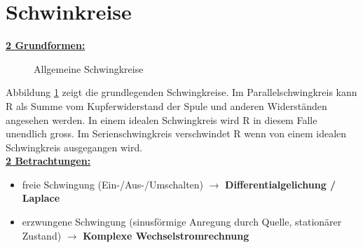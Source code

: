 \section{Schwinkreise}
\underline{\textbf{2 Grundformen:}}\\
\begin{figure}[!h]
\centering
{}
\qquad
{}
\caption{Allgemeine Schwingkreise}
\label{fig:schwingkreise}
\end{figure}

Abbildung \ref{fig:schwingkreise} zeigt die grundlegenden Schwingkreise. Im
Parallelschwingkreis  kann R als Summe vom
Kupferwiderstand der Spule und anderen Widerständen angesehen werden. In einem
idealen Schwingkreis wird R in diesem Falle unendlich gross. Im
Serienschwingkreis  verschwindet R wenn von
einem idealen Schwingkreis ausgegangen wird. \\

\underline{\textbf{2 Betrachtungen:}}\\
\begin{itemize}
  \item freie Schwingung (Ein-/Aus-/Umschalten) $\rightarrow$
  \textbf{Differentialgelichung / Laplace}
  \item erzwungene Schwingung (sinusförmige Anregung durch Quelle, stationärer
  Zustand) $\rightarrow$ \textbf{Komplexe Wechselstromrechnung}
\end{itemize}



